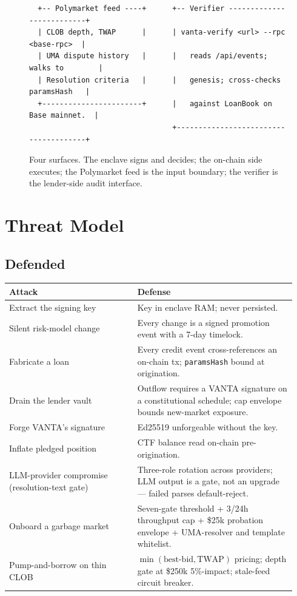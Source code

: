 \documentclass[11pt,letterpaper]{article}
\begin{document}
\begin{figure}[h]
\begin{minipage}{0.96\textwidth}
\begin{verbatim}
  +-- Polymarket feed ----+      +-- Verifier --------------------------+
  | CLOB depth, TWAP      |      | vanta-verify <url> --rpc <base-rpc>  |
  | UMA dispute history   |      |   reads /api/events; walks to        |
  | Resolution criteria   |      |   genesis; cross-checks paramsHash   |
  +-----------------------+      |   against LoanBook on Base mainnet.  |
                                 +--------------------------------------+
\end{verbatim}
\end{minipage}
\caption{Four surfaces. The enclave signs and decides; the on-chain side executes; the Polymarket feed is the input boundary; the verifier is the lender-side audit interface.}
\label{fig:arch}
\end{figure}

\section{Threat Model}
\label{sec:threats}

\subsection{Defended}

\begin{center}\small
\begin{tabular}{@{}p{0.42\linewidth}p{0.52\linewidth}@{}}
\toprule
\textbf{Attack} & \textbf{Defense} \\
\midrule
Extract the signing key & Key in enclave RAM; never persisted. \\
Silent risk-model change & Every change is a signed promotion event with a 7-day timelock. \\
Fabricate a loan & Every credit event cross-references an on-chain tx; \texttt{paramsHash} bound at origination. \\
Drain the lender vault & Outflow requires a VANTA signature on a constitutional schedule; cap envelope bounds new-market exposure. \\
Forge VANTA's signature & Ed25519 unforgeable without the key. \\
Inflate pledged position & CTF balance read on-chain pre-origination. \\
LLM-provider compromise (resolution-text gate) & Three-role rotation across providers; LLM output is a gate, not an upgrade --- failed parses default-reject. \\
Onboard a garbage market & Seven-gate threshold + 3/24h throughput cap + \$25k probation envelope + UMA-resolver and template whitelist. \\
Pump-and-borrow on thin CLOB & $\min(\text{best-bid}, \text{TWAP})$ pricing; depth gate at \$250k 5\%-impact; stale-feed circuit breaker. \\
\bottomrule
\end{tabular}
\end{center}
\end{document}
